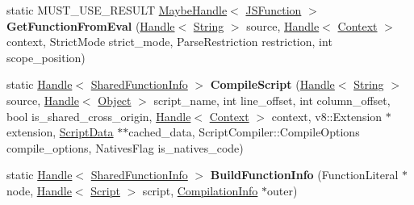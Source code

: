 \begin{DoxyCompactItemize}
\item 
\hypertarget{classv8_1_1internal_1_1_compiler_a0034d1268cc42e79d3e862dd31579515}{}static M\+U\+S\+T\+\_\+\+U\+S\+E\+\_\+\+R\+E\+S\+U\+L\+T \hyperlink{classv8_1_1internal_1_1_maybe_handle}{Maybe\+Handle}$<$ \hyperlink{classv8_1_1internal_1_1_j_s_function}{J\+S\+Function} $>$ {\bfseries Get\+Function\+From\+Eval} (\hyperlink{classv8_1_1internal_1_1_handle}{Handle}$<$ \hyperlink{classv8_1_1internal_1_1_string}{String} $>$ source, \hyperlink{classv8_1_1internal_1_1_handle}{Handle}$<$ \hyperlink{classv8_1_1internal_1_1_context}{Context} $>$ context, Strict\+Mode strict\+\_\+mode, Parse\+Restriction restriction, int scope\+\_\+position)\label{classv8_1_1internal_1_1_compiler_a0034d1268cc42e79d3e862dd31579515}

\item 
\hypertarget{classv8_1_1internal_1_1_compiler_ad8eaacb99d5e7d2f8fe414794a89f82a}{}static \hyperlink{classv8_1_1internal_1_1_handle}{Handle}$<$ \hyperlink{classv8_1_1internal_1_1_shared_function_info}{Shared\+Function\+Info} $>$ {\bfseries Compile\+Script} (\hyperlink{classv8_1_1internal_1_1_handle}{Handle}$<$ \hyperlink{classv8_1_1internal_1_1_string}{String} $>$ source, \hyperlink{classv8_1_1internal_1_1_handle}{Handle}$<$ \hyperlink{classv8_1_1internal_1_1_object}{Object} $>$ script\+\_\+name, int line\+\_\+offset, int column\+\_\+offset, bool is\+\_\+shared\+\_\+cross\+\_\+origin, \hyperlink{classv8_1_1internal_1_1_handle}{Handle}$<$ \hyperlink{classv8_1_1internal_1_1_context}{Context} $>$ context, v8\+::\+Extension $\ast$extension, \hyperlink{classv8_1_1internal_1_1_script_data}{Script\+Data} $\ast$$\ast$cached\+\_\+data, Script\+Compiler\+::\+Compile\+Options compile\+\_\+options, Natives\+Flag is\+\_\+natives\+\_\+code)\label{classv8_1_1internal_1_1_compiler_ad8eaacb99d5e7d2f8fe414794a89f82a}

\item 
\hypertarget{classv8_1_1internal_1_1_compiler_af94d45cd7074f7b4628ce91248b3a514}{}static \hyperlink{classv8_1_1internal_1_1_handle}{Handle}$<$ \hyperlink{classv8_1_1internal_1_1_shared_function_info}{Shared\+Function\+Info} $>$ {\bfseries Build\+Function\+Info} (Function\+Literal $\ast$node, \hyperlink{classv8_1_1internal_1_1_handle}{Handle}$<$ \hyperlink{classv8_1_1internal_1_1_script}{Script} $>$ script, \hyperlink{classv8_1_1internal_1_1_compilation_info}{Compilation\+Info} $\ast$outer)\label{classv8_1_1internal_1_1_compiler_af94d45cd7074f7b4628ce91248b3a514}


\end{DoxyCompactItemize}
